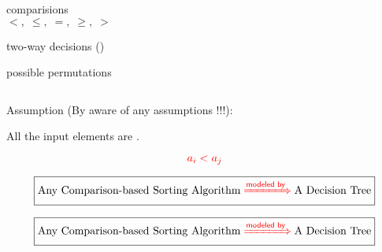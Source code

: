 \begin{frame}{}
  \begin{center}
    {\Large {}} 

    \pause
    \vspace{0.20cm}
    \begin{columns}
	\begin{description}[Leaves:]
	  \item[Nodes:] comparisions 
	    \[
	      <,\; \le,\; =,\; \ge,\; >
	    \]
	  \item[Edges:] two-way decisions ()
	  \item[Leaves:] possible permutations
	\end{description}
    \end{columns}

    \pause
    \vspace{0.60cm}
    \begin{alertblock}{Assumption (By aware of any assumptions !!!):}
      \centerline{All the input elements are .}
      \[
	\textcolor{red}{a_i < a_j}
      \]
    \end{alertblock}
  \end{center}
\end{frame}

\begin{frame}{}
  \begin{center}
    {\Large {}} 
  \end{center}

  \vspace{-0.40cm}
  \[
    \boxed{\text{Any Comparison-based Sorting Algorithm} \;\textcolor{red}{\xRightarrow{ \textsf{modeled by} }}\; \text{A Decision Tree}}
  \]


\end{frame}

\begin{frame}{}
  \begin{center}
    {\Large {}} 
  \end{center}

  \vspace{-0.40cm}
  \[
    \boxed{\text{Any Comparison-based Sorting Algorithm} \;\textcolor{red}{\xRightarrow{ \textsf{modeled by} }}\; \text{A Decision Tree}}
  \]

  \pause
  
\end{frame}

